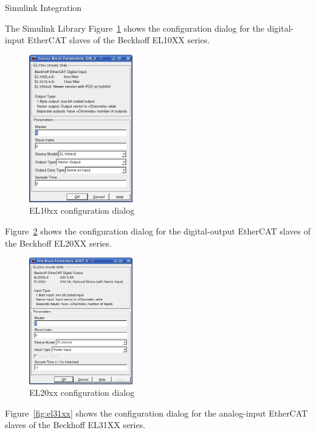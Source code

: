 \begin{ighsec}{Simulink Integration}
\begin{ighsec}{The Simulink Library}
Figure~\ref{fig:el10xx} shows the configuration dialog for the
digital-input EtherCAT slaves of the Beckhoff EL10XX series.

\begin{figure}[H]
  \begin{center}
    \includegraphics[width=0.4\textwidth]{images/el10xx.png}
    \caption{EL10xx configuration dialog}
    \label{fig:el10xx}
  \end{center}
\end{figure}

Figure~\ref{fig:el20xx} shows the configuration dialog for the
digital-output EtherCAT slaves of the Beckhoff EL20XX series.

\begin{figure}[H]
  \begin{center}
    \includegraphics[width=0.4\textwidth]{images/el20xx.png}
    \caption{EL20xx configuration dialog}
    \label{fig:el20xx}
  \end{center}
\end{figure}

Figure~\ref{fig:el31xx} shows the configuration dialog for the
analog-input EtherCAT slaves of the Beckhoff EL31XX series.


\end{ighsec}
\end{ighsec}

